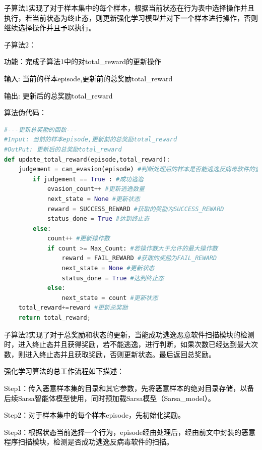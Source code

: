 \textcolor{black}{子算法1实现了对于样本集中的每个样本，根据当前状态在行为表中选择操作并且执行，若当前状态为终止态，则更新强化学习模型并对下一个样本进行操作，否则继续选择操作并且予以执行。}

\textcolor{black}{子算法2：}

\textcolor{black}{功能：完成子算法1中的对total\_reward的更新操作}

\textcolor{black}{输入: 当前的样本episode,更新前的总奖励total\_reward}

\textcolor{black}{输出: 更新后的总奖励total\_reward}

\textcolor{black}{算法伪代码：}

\begin{lstlisting}[language=Python, caption={}, label={lst:pythonfile3}]
#---更新总奖励的函数---
#Input: 当前的样本episode,更新前的总奖励total_reward
#OutPut: 更新后的总奖励total_reward
def update_total_reward(episode,total_reward):
    judgement = can_evasion(episode) #判断处理后的样本是否能逃逸反病毒软件的查杀
        if judgement == True : #成功逃逸
            evasion_count++ #更新逃逸数量
            next_state = None #更新状态
            reward = SUCCESS_REWARD #获取的奖励为SUCCESS_REWARD
            status_done = True #达到终止态
        else:
            count++ #更新操作数
            if count >= Max_Count: #若操作数大于允许的最大操作数
                reward = FAIL_REWARD #获取的奖励为FAIL_REWARD
                next_state = None #更新状态
                status_done = True #达到终止态
            else:
                next_state = count #更新状态
    total_reward+=reward #更新总奖励
    return total_reward; 
\end{lstlisting}

\textcolor{black}{子算法2实现了对于总奖励和状态的更新，当能成功逃逸恶意软件扫描模块的检测时，进入终止态并且获得奖励，若不能逃逸，进行判断，如果次数已经达到最大次数，则进入终止态并且获取奖励，否则更新状态。最后返回总奖励。}

\textcolor{black}{强化学习算法的总工作流程如下描述：}

\textcolor{black}{Step1：传入恶意样本集的目录和其它参数，先将恶意样本的绝对目录存储，以备后续Sarsa智能体模型使用，同时预加载Sarsa模型（Sarsa\_model）。}

\textcolor{black}{Step2：对于样本集中的每个样本episode，先初始化奖励。}

\textcolor{black}{Step3：根据状态当前选择一个行为，episode经由处理后，经由前文中封装的恶意程序扫描模块，检测是否成功逃逸反病毒软件的扫描。}

